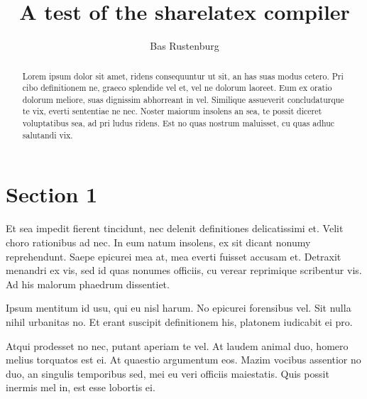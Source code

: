 \documentclass[a4paper,10pt]{article}
\title{A test of the sharelatex compiler}
\author{Bas Rustenburg}
\begin{document}
\maketitle

\begin{abstract}
Lorem ipsum dolor sit amet, ridens consequuntur ut sit, an has suas modus cetero.
Pri cibo definitionem ne, graeco splendide vel et, vel ne dolorum laoreet.
Eum ex oratio dolorum meliore, suas dignissim abhorreant in vel.
Similique assueverit concludaturque te vix, everti sententiae ne nec.
Noster maiorum insolens an sea, te possit diceret voluptatibus sea, ad pri ludus ridens.
Est no quas nostrum maluisset, cu quas adhuc salutandi vix.
\end{abstract}

\section{Section 1}
Et sea impedit fierent tincidunt, nec delenit definitiones delicatissimi et. Velit choro rationibus ad nec. In eum natum insolens, ex sit dicant nonumy reprehendunt. Saepe epicurei mea at, mea everti fuisset accusam et. Detraxit menandri ex vis, sed id quas nonumes officiis, cu verear reprimique scribentur vis. Ad his malorum phaedrum dissentiet.

Ipsum mentitum id usu, qui eu nisl harum. No epicurei forensibus vel. Sit nulla nihil urbanitas no. Et erant suscipit definitionem his, platonem iudicabit ei pro.

Atqui prodesset no nec, putant aperiam te vel. At laudem animal duo, homero melius torquatos est ei. At quaestio argumentum eos. Mazim vocibus assentior no duo, an singulis temporibus sed, mei eu veri officiis maiestatis. Quis possit inermis mel in, est esse lobortis ei.
\end{document}
